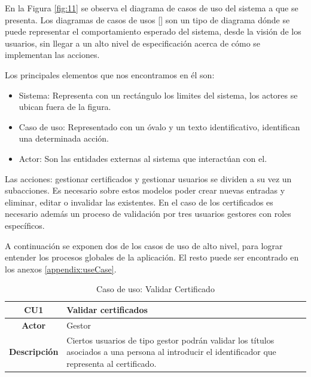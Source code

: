 En la Figura \ref{fig:11} se observa el diagrama de casos de uso del sistema a que se presenta. Los diagramas de casos de usos [\cite{91}] son un tipo de diagrama dónde se puede representar el comportamiento esperado del sistema, desde la visión de los usuarios, sin llegar a un alto nivel de especificación acerca de cómo se implementan las acciones. 

Los principales elementos que nos encontramos en él son:
\begin{itemize}
	\item Sistema: Representa con un rectángulo los limites del sistema, los actores se ubican fuera de la figura.
	\item Caso de uso: Representado con un óvalo y un texto identificativo, identifican una determinada acción.
	\item Actor: Son las entidades externas al sistema que interactúan con el.
\end{itemize}

Las acciones: gestionar certificados y gestionar usuarios se dividen a su vez un subacciones. Es necesario sobre estos modelos poder crear nuevas entradas y eliminar, editar o invalidar las existentes. En el caso de los certificados es necesario además un proceso de validación por tres usuarios gestores con roles específicos.

A continuación se exponen dos de los casos de uso de alto nivel, para lograr entender los procesos globales de la aplicación. El resto puede ser encontrado en los anexos \ref{appendix:useCase}.

\begin{table}[!h]
	\begin{center}
		\begin{tabular}{|c|p{10cm}|}
			\hline \textbf{CU1} & Validar certificados \\ 
			\hline \textbf{Actor} & Gestor \\ 
			\hline \textbf{Descripción} & Ciertos usuarios de tipo gestor podrán validar los títulos asociados a una persona al introducir el identificador que representa al certificado.  \\ 
			\hline 
		\end{tabular}
		\caption{Caso de uso: Validar Certificado}
		\label{tab:CU1}
	\end{center}
\end{table}

